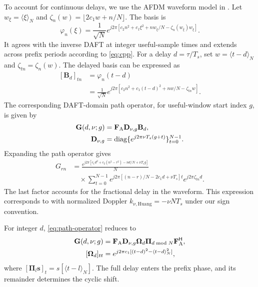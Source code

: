 To account for continuous delays, we use the AFDM waveform model in
\cite{huang2026}. Let $w_\xi=\langle\xi\rangle_N$ and
$\zeta_n(w)=\lfloor2c_1w+n/N\rfloor$. The basis is
\begin{equation}
 \varphi_n(\xi)=\frac{1}{\sqrt N}
 e^{j2\pi[c_2n^2+c_1\xi^2+nw_\xi/N-\zeta_n(w_\xi)w_\xi]}.
 \label{eq:continuous-waveform}
\end{equation}
It agrees with the inverse DAFT at integer useful-sample times and
extends across prefix periods according to \eqref{eq:cpp}.
For a delay $d=\tau/T_s$, set $w=\langle t-d\rangle_N$ and
$\zeta_{tn}=\zeta_n(w)$. The delayed basis can be expressed as
\begin{equation}
 \begin{aligned}
 [\mathbf B_d]_{tn}&=\varphi_n(t-d)\\
 &=\frac{1}{\sqrt N}
 e^{j2\pi[c_2n^2+c_1(t-d)^2+nw/N-\zeta_{tn}w]}.
 \end{aligned}
 \label{eq:continuous-basis}
\end{equation}
The corresponding DAFT-domain path operator, for useful-window start
index $g$, is given by
\begin{equation}
 \begin{aligned}
 \mathbf G(d,\nu;g)&=\mathbf F_{\rm A}\mathbf D_{\nu,g}\mathbf B_d,\\
 \mathbf D_{\nu,g}&=\operatorname{diag}\{e^{j2\pi\nu T_s(g+t)}\}_{t=0}^{N-1}.
 \end{aligned}
 \label{eq:path-operator}
\end{equation}
Expanding the path operator gives
\begin{equation}
 \begin{split}
 G_{rn}
 &=\frac{e^{j2\pi[c_1d^2+c_2(n^2-r^2)-nd/N+\nu T_sg]}}{N}\\
 &\quad\times\sum_{t=0}^{N-1}
 e^{j2\pi[(n-r)/N-2c_1d+\nu T_s]t}
 e^{j2\pi\zeta_{tn}d}.
 \end{split}
 \label{eq:path-entry-expansion}
\end{equation}
The last factor accounts for the fractional delay in the waveform.
This expression corresponds to \cite{huang2026} with normalized
Doppler $k_{\nu,\mathrm{Huang}}=-\nu NT_s$ under our sign convention.

For integer $d$, \eqref{eq:path-operator} reduces to
\begin{align}
 \mathbf G(d,\nu;g)
 &=\mathbf F_{\rm A}\mathbf D_{\nu,g}\bm\Omega_d
   \bm\Pi_{d\bmod N}\mathbf F_{\rm A}^{\mathsf H},
 \label{eq:integer-operator}\\
 [\bm\Omega_d]_{tt}
 &=e^{j2\pi c_1[(t-d)^2-\langle t-d\rangle_N^2]},
 \label{eq:integer-prefix-phase}
\end{align}
where $[\bm\Pi_l\mathbf s]_t=s[\langle t-l\rangle_N]$.
The full delay enters the prefix phase, and its remainder determines
the cyclic shift.

